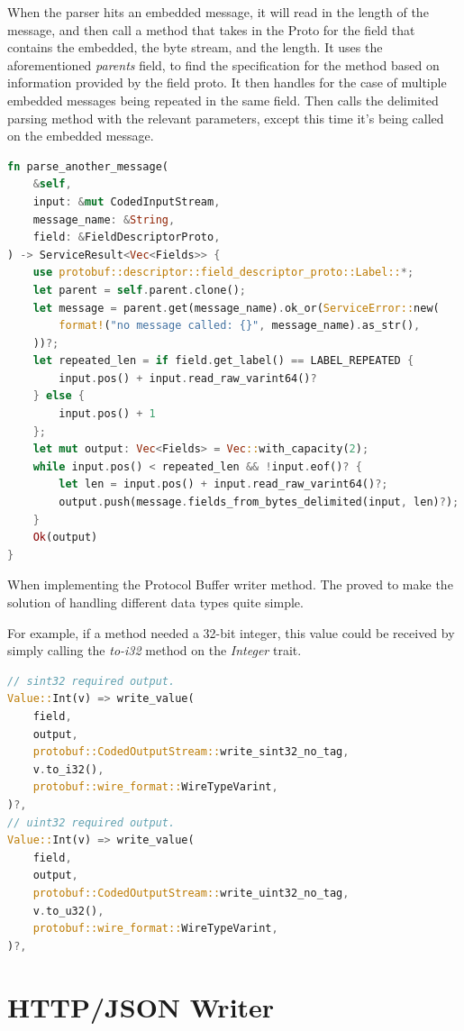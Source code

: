 \documentclass[a4paper,12pt]{report}
\begin{document}
When the parser hits an embedded message, it will read in the length of the message, and then call a method that takes in the Proto for the field that contains the embedded, the byte stream, and the length.
It uses the aforementioned \textit{parents} field, to find the specification for the method based on information provided by the field proto.
It then handles for the case of multiple embedded messages being repeated in the same field. Then calls the delimited parsing method with the relevant parameters, except this time it's being called on the embedded message.

\begin{lstlisting}[language=Rust]
fn parse_another_message(
    &self,
    input: &mut CodedInputStream,
    message_name: &String,
    field: &FieldDescriptorProto,
) -> ServiceResult<Vec<Fields>> {
    use protobuf::descriptor::field_descriptor_proto::Label::*;
    let parent = self.parent.clone();
    let message = parent.get(message_name).ok_or(ServiceError::new(
        format!("no message called: {}", message_name).as_str(),
    ))?;
    let repeated_len = if field.get_label() == LABEL_REPEATED {
        input.pos() + input.read_raw_varint64()?
    } else {
        input.pos() + 1
    };
    let mut output: Vec<Fields> = Vec::with_capacity(2);
    while input.pos() < repeated_len && !input.eof()? {
        let len = input.pos() + input.read_raw_varint64()?;
        output.push(message.fields_from_bytes_delimited(input, len)?);
    }
    Ok(output)
}
\end{lstlisting}

When implementing the Protocol Buffer writer method. The \textit{} proved to make the solution of handling different data types quite simple.

For example, if a method needed a 32-bit integer, this value could be received by simply calling the \textit{to-i32} method on the \textit{Integer} trait.

\begin{lstlisting}[language=Rust]
// sint32 required output.
Value::Int(v) => write_value(
    field,
    output,
    protobuf::CodedOutputStream::write_sint32_no_tag,
    v.to_i32(),
    protobuf::wire_format::WireTypeVarint,
)?,
// uint32 required output.
Value::Int(v) => write_value(
    field,
    output,
    protobuf::CodedOutputStream::write_uint32_no_tag,
    v.to_u32(),
    protobuf::wire_format::WireTypeVarint,
)?,
\end{lstlisting}

\section{HTTP/JSON Writer}
\label{im:http}
\end{document}
